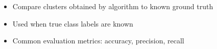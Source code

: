 \begin{multicols}{2}
\begin{itemize}
\begin{itemize}
    \begin{itemize}
        \item
      Compare clusters obtained by algorithm to known ground truth
    \item
      Used when true class labels are known
    \item
      Common evaluation metrics: accuracy, precision, recall
    \end{itemize}
  \end{itemize}
\end{itemize}
\end{multicols}